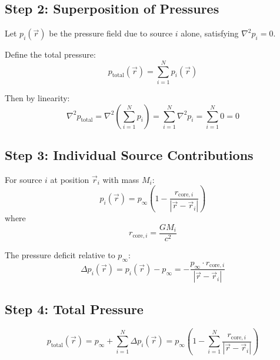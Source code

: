 \documentclass[12pt,a4paper,openany]{book}
\theoremstyle{definition}
\theoremstyle{plain}
\theoremstyle{remark}
\newcommand{\pinfty}{p_\infty}             %
\begin{document}
\subsection{Step 2: Superposition of Pressures}

Let $p_i(\vec{r})$ be the pressure field due to source $i$ alone, satisfying $\nabla^2 p_i = 0$.

Define the total pressure:
\begin{equation}
p_{\text{total}}(\vec{r}) = \sum_{i=1}^{N} p_i(\vec{r})
\label{eq:p_total}
\end{equation}

Then by linearity:
\begin{equation}
\nabla^2 p_{\text{total}} = \nabla^2\left(\sum_{i=1}^{N} p_i\right) = \sum_{i=1}^{N} \nabla^2 p_i = \sum_{i=1}^{N} 0 = 0
\label{eq:laplace_total}
\end{equation}

\subsection{Step 3: Individual Source Contributions}

For source $i$ at position $\vec{r}_i$ with mass $M_i$:
\begin{equation}
p_i(\vec{r}) = \pinfty\left(1 - \frac{r_{\text{core},i}}{|\vec{r} - \vec{r}_i|}\right)
\label{eq:p_i}
\end{equation}
where
\begin{equation}
r_{\text{core},i} = \frac{GM_i}{c^2}
\label{eq:rcore_i}
\end{equation}

The pressure deficit relative to $\pinfty$:
\begin{equation}
\Delta p_i(\vec{r}) = p_i(\vec{r}) - \pinfty = -\frac{\pinfty \cdot r_{\text{core},i}}{|\vec{r} - \vec{r}_i|}
\label{eq:delta_p}
\end{equation}

\subsection{Step 4: Total Pressure}

\begin{equation}
p_{\text{total}}(\vec{r}) = \pinfty + \sum_{i=1}^{N} \Delta p_i(\vec{r}) = \pinfty\left(1 - \sum_{i=1}^{N}\frac{r_{\text{core},i}}{|\vec{r} - \vec{r}_i|}\right)
\label{eq:p_total_explicit}
\end{equation}
\end{document}
